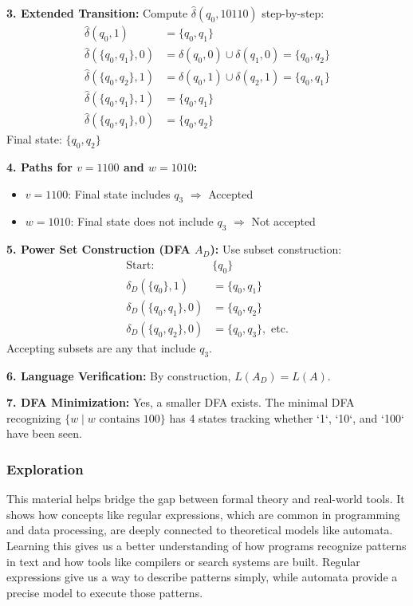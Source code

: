 \documentclass{article}
\theoremstyle{theorem}
\theoremstyle{definition}
\theoremstyle{remark}
\begin{document}
\textbf{3. Extended Transition:}  
Compute $\hat{\delta}(q_0, 10110)$ step-by-step:
\[
\begin{aligned}
\hat{\delta}(q_0, 1) &= \{q_0, q_1\} \\
\hat{\delta}(\{q_0, q_1\}, 0) &= \delta(q_0, 0) \cup \delta(q_1, 0) = \{q_0, q_2\} \\
\hat{\delta}(\{q_0, q_2\}, 1) &= \delta(q_0,1) \cup \delta(q_2,1) = \{q_0, q_1\} \\
\hat{\delta}(\{q_0, q_1\}, 1) &= \{q_0, q_1\} \\
\hat{\delta}(\{q_0, q_1\}, 0) &= \{q_0, q_2\}
\end{aligned}
\]
Final state: $\{q_0, q_2\}$

\textbf{4. Paths for $v = 1100$ and $w = 1010$:}
\begin{itemize}
\item $v = 1100$: Final state includes $q_3$ $\Rightarrow$ Accepted
\item $w = 1010$: Final state does not include $q_3$ $\Rightarrow$ Not accepted
\end{itemize}

\textbf{5. Power Set Construction (DFA $A_D$):}
Use subset construction:
\[
\begin{aligned}
\text{Start: } & \{q_0\} \\
\delta_D(\{q_0\}, 1) &= \{q_0, q_1\} \\
\delta_D(\{q_0, q_1\}, 0) &= \{q_0, q_2\} \\
\delta_D(\{q_0, q_2\}, 0) &= \{q_0, q_3\}, \text{ etc.}
\end{aligned}
\]
Accepting subsets are any that include $q_3$.

\textbf{6. Language Verification:}  
By construction, $L(A_D) = L(A)$.

\textbf{7. DFA Minimization:}  
Yes, a smaller DFA exists. The minimal DFA recognizing $\{ w \mid w \text{ contains } 100 \}$ has 4 states tracking whether `1`, `10`, and `100` have been seen.


\subsubsection{Exploration}

This material helps bridge the gap between formal theory and real-world tools. It shows how concepts like regular expressions, which are common in programming and data processing, are deeply connected to theoretical models like automata. Learning this gives us a better understanding of how programs recognize patterns in text and how tools like compilers or search systems are built. Regular expressions give us a way to describe patterns simply, while automata provide a precise model to execute those patterns.
\end{document}
